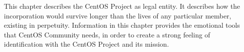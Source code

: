 
This chapter describes the CentOS Project as legal entity.  It
describes how the incorporation would survive longer than the lives of
any particular member, existing in perpetuity.  Information in this
chapter provides the emotional tools that CentOS Community needs, in
order to create a strong feeling of identification with the CentOS
Project and its mission.

